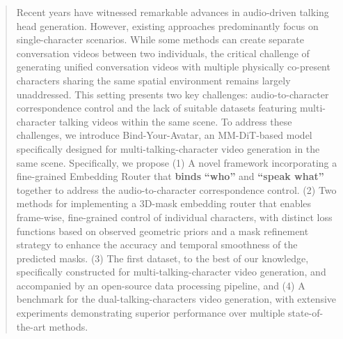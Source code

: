 
\begin{abstract}
Recent years have witnessed remarkable advances in audio-driven talking head generation. However, existing approaches predominantly focus on single-character scenarios. While some methods can create separate conversation videos between two individuals, the
critical challenge of generating unified conversation videos
with multiple physically co-present characters sharing the
same spatial environment remains largely unaddressed.
This setting presents two key challenges: audio-to-character correspondence control and the lack of suitable datasets featuring multi-character talking videos within the same scene. To address these challenges, we introduce Bind-Your-Avatar, an MM-DiT-based model specifically designed for multi-talking-character video generation in the same scene.
Specifically, we propose (1) A novel framework incorporating a fine-grained Embedding Router that \textbf{binds} \textbf{``who''} and \textbf{``speak what''} together to address the audio-to-character correspondence control. (2) Two methods for implementing a 3D-mask embedding router that enables frame-wise, fine-grained control of individual characters, with distinct loss functions based on observed geometric priors and a mask refinement strategy to enhance the accuracy and temporal smoothness of the predicted masks. (3) The first dataset, to the best of our knowledge, specifically constructed for multi-talking-character video generation, and accompanied by an open-source data processing pipeline, and (4) A benchmark for the dual-talking-characters video generation, with extensive experiments demonstrating superior performance over multiple state-of-the-art methods. 
\end{abstract}